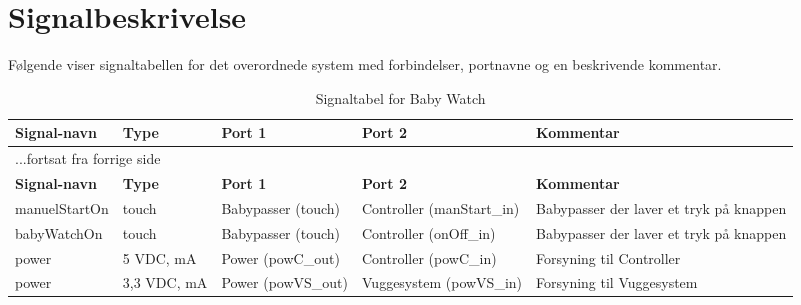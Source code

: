 

\section{Signalbeskrivelse} \label{overordnet:signalbeskrivelse}

Følgende viser signaltabellen for det overordnede system med forbindelser, portnavne og en beskrivende kommentar.

\begin{center}
\label{overordnet:signaltabel}
\begin{longtable}{|p{}|p{}|p{}|p{}|p{3cm}|}
\caption{Signaltabel for Baby Watch}\\
\hline
\textbf{Signal-navn}	&\textbf{Type} 		&\textbf{Port 1} 	&\textbf{Port 2} 			&\textbf{Kommentar} \\ \hline
\endfirsthead
\multicolumn{5}{l}{...fortsat fra forrige side} \\ \hline 
\textbf{Signal-navn}	&\textbf{Type} 		&\textbf{Port 1} 	&\textbf{Port 2} 			&\textbf{Kommentar} \\ \hline
\endhead


manuelStartOn
&touch
&Babypasser \newline (touch)
&Controller \newline (manStart\_in)
&Babypasser der laver et tryk på knappen
\\\hline

babyWatchOn
&touch
&Babypasser \newline (touch)
&Controller \newline (onOff\_in)
&Babypasser der laver et tryk på knappen
\\\hline

power
&5 VDC, \newline 1200 mA
&Power \newline(powC\_out)
&Controller \newline(powC\_in)
&Forsyning til Controller
\\\hline

power
&3,3 VDC, \newline 500 mA
&Power \newline(powVS\_out)
&Vuggesystem \newline(powVS\_in)
&Forsyning til Vuggesystem
\\\hline


\end{longtable}
\end{center}
